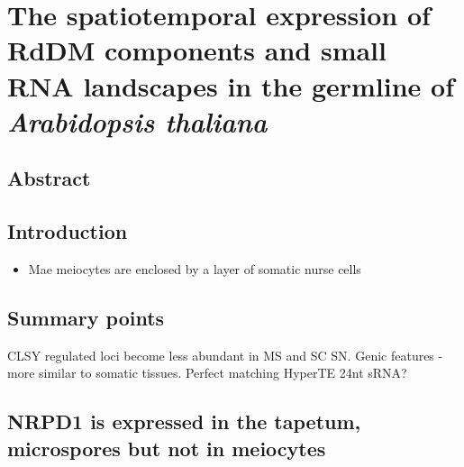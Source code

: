
\chapter{The spatiotemporal expression of RdDM components and small RNA landscapes in the germline of \textit{Arabidopsis thaliana}}

\ifpdf
    \graphicspath{{Chapter2/Figs/Raster/}{Chapter2/Figs/PDF/}{Chapter2/Figs/}}
\else
    \graphicspath{{Chapter2/Figs/Vector/}{Chapter2/Figs/}}
\fi


\section{Abstract}



\section{Introduction}

\begin{itemize}
    \item Mae meiocytes are enclosed by a layer of somatic nurse cells
\end{itemize}

\section{Summary points}

CLSY regulated loci become less abundant in MS and SC SN. 
Genic features - more similar to somatic tissues.
Perfect matching HyperTE 24nt sRNA?



\section{NRPD1 is expressed in the tapetum, microspores but not in meiocytes}

